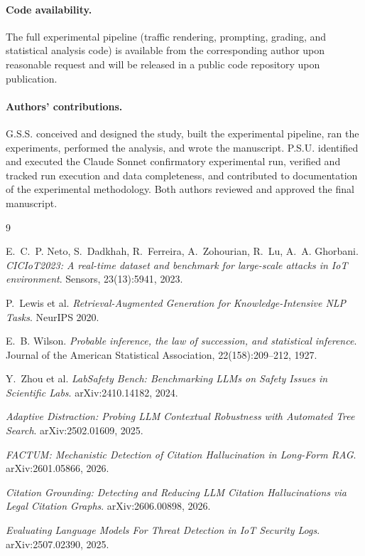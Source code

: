 \documentclass[twocolumn]{svjour3}
\begin{document}
\paragraph{Code availability.} The full experimental pipeline (traffic rendering, prompting,
grading, and statistical analysis code) is available from the corresponding author upon
reasonable request and will be released in a public code repository upon publication.

\paragraph{Authors' contributions.} G.S.S. conceived and designed the study, built the
experimental pipeline, ran the experiments, performed the analysis, and wrote the manuscript.
P.S.U. identified and executed the Claude Sonnet confirmatory experimental run, verified and
tracked run execution and data completeness, and contributed to documentation of the experimental
methodology. Both authors reviewed and approved the final manuscript.

\begin{thebibliography}{9}

E.~C.~P. Neto, S.~Dadkhah, R.~Ferreira, A.~Zohourian, R.~Lu, A.~A. Ghorbani.
\textit{CICIoT2023: A real-time dataset and benchmark for large-scale attacks in IoT
environment}. Sensors, 23(13):5941, 2023.

P.~Lewis et al.
\textit{Retrieval-Augmented Generation for Knowledge-Intensive NLP Tasks}.
NeurIPS 2020.

E.~B. Wilson.
\textit{Probable inference, the law of succession, and statistical inference}.
Journal of the American Statistical Association, 22(158):209--212, 1927.

Y.~Zhou et al.
\textit{LabSafety Bench: Benchmarking LLMs on Safety Issues in Scientific Labs}.
arXiv:2410.14182, 2024.

\textit{Adaptive Distraction: Probing LLM Contextual Robustness with Automated Tree Search}.
arXiv:2502.01609, 2025.

\textit{FACTUM: Mechanistic Detection of Citation Hallucination in Long-Form RAG}.
arXiv:2601.05866, 2026.

\textit{Citation Grounding: Detecting and Reducing LLM Citation Hallucinations via Legal
Citation Graphs}. arXiv:2606.00898, 2026.

\textit{Evaluating Language Models For Threat Detection in IoT Security Logs}.
arXiv:2507.02390, 2025.

\end{thebibliography}
\end{document}
